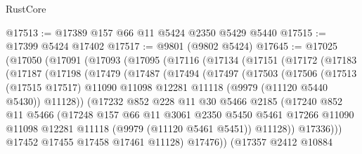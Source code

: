 \begin{lexlean}{RustCore}
\begin{coremodule}
@17513 := @17389 @157 @66 @11 @5424 @2350 @5429 @5440
@17515 := @17399 @5424 @17402
@17517 := @9801 (@9802 @5424)
@17645 := @17025
    (@17050
      (@17091
        (@17093
          (@17095
            (@17116
              (@17134
                (@17151
                  (@17172
                    (@17183
                      (@17187
                        (@17198
                          (@17479
                            (@17487
                              (@17494
                                (@17497
                                  (@17503
                                    (@17506
                                      (@17513
                                        (@17515 @17517)
                                        @11090
                                        @11098
                                        @12281
                                        @11118
                                        (@9979 (@11120 @5440 @5430))
                                        @11128))
                                    (@17232
                                      @852
                                      @228
                                      @11
                                      @30
                                      @5466
                                      @2185
                                      (@17240
                                        @852
                                        @11
                                        @5466
                                        (@17248
                                          @157
                                          @66
                                          @11
                                          @3061
                                          @2350
                                          @5450
                                          @5461
                                          @17266
                                          @11090
                                          @11098
                                          @12281
                                          @11118
                                          (@9979 (@11120 @5461 @5451))
                                          @11128))
                                      @17336)))
                                @17452
                                @17455
                                @17458
                                @17461
                                @11128)
                              @17476))
                          (@17357
                            @2412
                            @10884

\end{coremodule}
\end{lexlean}
